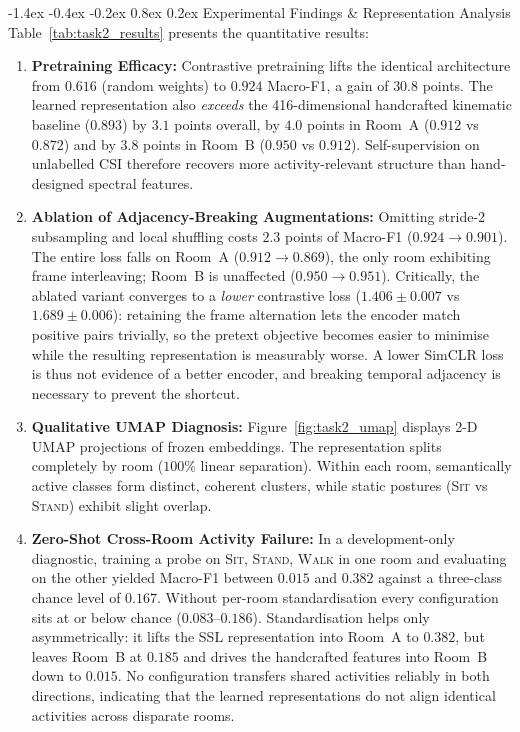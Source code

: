 \documentclass[10pt,a4paper]{article}
\makeatletter
\renewcommand{\subsection}{\@startsection{subsection}{2}{\z@}%
  {-1.4ex \@plus -0.4ex \@minus -0.2ex}%
  {0.8ex \@plus 0.2ex}%
  {\normalfont\normalsize\bfseries\color{secondary}}}
\makeatother
\begin{document}
\subsection{Experimental Findings \& Representation Analysis}
Table~\ref{tab:task2_results} presents the quantitative results:
\begin{enumerate}
    \item \textbf{Pretraining Efficacy:} Contrastive pretraining lifts the identical architecture from $0.616$ (random weights) to $\mathbf{0.924}$ Macro-F1, a gain of $30.8$ points. The learned representation also \emph{exceeds} the 416-dimensional handcrafted kinematic baseline ($0.893$) by $3.1$ points overall, by $4.0$ points in Room~A ($0.912$ vs $0.872$) and by $3.8$ points in Room~B ($0.950$ vs $0.912$). Self-supervision on unlabelled CSI therefore recovers more activity-relevant structure than hand-designed spectral features.
    \item \textbf{Ablation of Adjacency-Breaking Augmentations:} Omitting stride-2 subsampling and local shuffling costs $2.3$ points of Macro-F1 ($0.924 \to 0.901$). The entire loss falls on Room~A ($0.912 \to 0.869$), the only room exhibiting frame interleaving; Room~B is unaffected ($0.950 \to 0.951$). Critically, the ablated variant converges to a \emph{lower} contrastive loss ($1.406 \pm 0.007$ vs $1.689 \pm 0.006$): retaining the frame alternation lets the encoder match positive pairs trivially, so the pretext objective becomes easier to minimise while the resulting representation is measurably worse. A lower SimCLR loss is thus not evidence of a better encoder, and breaking temporal adjacency is necessary to prevent the shortcut.
    \item \textbf{Qualitative UMAP Diagnosis:} Figure~\ref{fig:task2_umap} displays 2-D UMAP projections of frozen embeddings. The representation splits completely by room ($100\%$ linear separation). Within each room, semantically active classes form distinct, coherent clusters, while static postures (\textsc{Sit} vs \textsc{Stand}) exhibit slight overlap.
    \item \textbf{Zero-Shot Cross-Room Activity Failure:} In a development-only diagnostic, training a probe on \textsc{Sit}, \textsc{Stand}, \textsc{Walk} in one room and evaluating on the other yielded Macro-F1 between $\mathbf{0.015}$ and $\mathbf{0.382}$ against a three-class chance level of $0.167$. Without per-room standardisation every configuration sits at or below chance ($0.083$--$0.186$). Standardisation helps only asymmetrically: it lifts the SSL representation into Room~A to $\mathbf{0.382}$, but leaves Room~B at $0.185$ and drives the handcrafted features into Room~B down to $0.015$. No configuration transfers shared activities reliably in both directions, indicating that the learned representations do not align identical activities across disparate rooms.
\end{enumerate}
\end{document}
